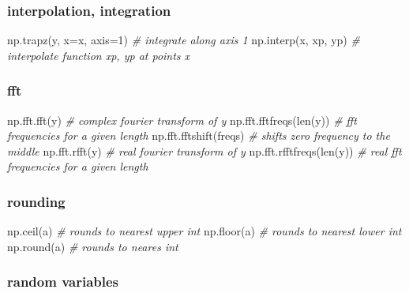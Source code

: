 \documentclass[10pt,a4paperpaper,twocolumn]{article}
\newenvironment{Shaded}{}{}
\newcommand{\DecValTok}[1]{\textcolor[rgb]{0.25,0.63,0.44}{{#1}}}
\newcommand{\CommentTok}[1]{\textcolor[rgb]{0.38,0.63,0.69}{\textit{{#1}}}}
\newcommand{\OperatorTok}[1]{\textcolor[rgb]{0.40,0.40,0.40}{{#1}}}
\newcommand{\BuiltInTok}[1]{{#1}}
\newcommand{\NormalTok}[1]{{#1}}
\begin{document}
\hypertarget{interpolation-integration}{\subsubsection{interpolation,
integration}\label{interpolation-integration}}

\begin{Shaded}
\begin{Highlighting}[]
\NormalTok{np.trapz(y, x}\OperatorTok{=}\NormalTok{x, axis}\OperatorTok{=}\DecValTok{1}\NormalTok{)  }\CommentTok{# integrate along axis 1}
\NormalTok{np.interp(x, xp, yp)      }\CommentTok{# interpolate function xp, yp at points x}
\end{Highlighting}
\end{Shaded}

\hypertarget{fft}{\subsubsection{fft}\label{fft}}

\begin{Shaded}
\begin{Highlighting}[]
\NormalTok{np.fft.fft(y)             }\CommentTok{# complex fourier transform of y}
\NormalTok{np.fft.fftfreqs(}\BuiltInTok{len}\NormalTok{(y))   }\CommentTok{# fft frequencies for a given length}
\NormalTok{np.fft.fftshift(freqs)    }\CommentTok{# shifts zero frequency to the middle}
\NormalTok{np.fft.rfft(y)            }\CommentTok{# real fourier transform of y}
\NormalTok{np.fft.rfftfreqs(}\BuiltInTok{len}\NormalTok{(y))  }\CommentTok{# real fft frequencies for a given length}
\end{Highlighting}
\end{Shaded}

\hypertarget{rounding}{\subsubsection{rounding}\label{rounding}}

\begin{Shaded}
\begin{Highlighting}[]
\NormalTok{np.ceil(a)   }\CommentTok{# rounds to nearest upper int}
\NormalTok{np.floor(a)  }\CommentTok{# rounds to nearest lower int}
\NormalTok{np.}\BuiltInTok{round}\NormalTok{(a)  }\CommentTok{# rounds to neares int}
\end{Highlighting}
\end{Shaded}

\hypertarget{random-variables}{\subsubsection{random
variables}\label{random-variables}}
\end{document}

